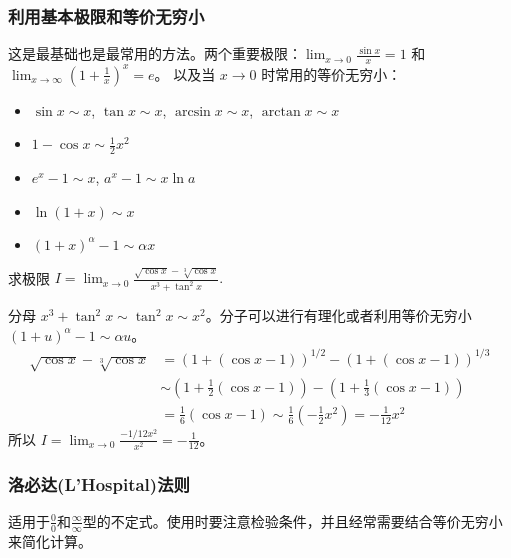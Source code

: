 \documentclass[lang=cn,newtx,10pt,scheme=chinese]{elegantbook}
\begin{document}
\subsubsection{利用基本极限和等价无穷小}
这是最基础也是最常用的方法。两个重要极限：$\lim_{x\to0}\frac{\sin x}{x}=1$ 和 $\lim_{x\to\infty}(1+\frac{1}{x})^x=e$。
以及当 $x \to 0$ 时常用的等价无穷小：
\begin{itemize}
    \item $\sin x \sim x$, $\tan x \sim x$, $\arcsin x \sim x$, $\arctan x \sim x$
    \item $1-\cos x \sim \frac{1}{2}x^2$
    \item $e^x - 1 \sim x$, $a^x - 1 \sim x\ln a$
    \item $\ln(1+x) \sim x$
    \item $(1+x)^\alpha - 1 \sim \alpha x$
\end{itemize}
\begin{problem}[CMC真题]
    求极限 $I=\lim_{x\rightarrow0}\frac{\sqrt{\cos x}-\sqrt[3]{\cos x}}{x^{3}+\tan^{2}x}.$
\end{problem}
\begin{solution}
    分母 $x^3+\tan^2 x \sim \tan^2 x \sim x^2$。分子可以进行有理化或者利用等价无穷小 $(1+u)^\alpha - 1 \sim \alpha u$。
    \begin{align*}
        \sqrt{\cos x} - \sqrt[3]{\cos x} &= (1+(\cos x - 1))^{1/2} - (1+(\cos x - 1))^{1/3} \\
        &\sim \left(1+\frac{1}{2}(\cos x - 1)\right) - \left(1+\frac{1}{3}(\cos x - 1)\right) \\
        &= \frac{1}{6}(\cos x - 1) \sim \frac{1}{6}(-\frac{1}{2}x^2) = -\frac{1}{12}x^2
    \end{align*}
    所以 $I = \lim_{x\to 0} \frac{-1/12 x^2}{x^2} = -\frac{1}{12}$。
\end{solution}

\subsubsection{洛必达(L'Hospital)法则}
适用于$\frac{0}{0}$和$\frac{\infty}{\infty}$型的不定式。使用时要注意检验条件，并且经常需要结合等价无穷小来简化计算。
\end{document}
